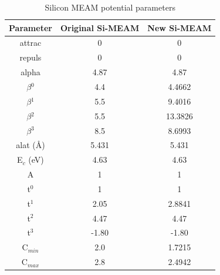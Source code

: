 \documentclass[review]{elsarticle}
\begin{document}
\begin{table}[h]
\caption{Silicon MEAM potential parameters}\label{tab:ben1}
\begin{center}
\begin{tabular}{|c|c|c|}
     \hline
     Parameter & Original Si-MEAM  & New Si-MEAM \\
     \hline
     attrac & 0 & 0 \\
     repuls & 0 & 0 \\
     alpha & 4.87 & 4.87 \\
     $\beta$$^{0}$ & 4.4 & 4.4662  \\
     $\beta$$^{1}$ & 5.5 & 9.4016 \\
     $\beta$$^{2}$ & 5.5 & 13.3826 \\  
     $\beta$$^{3}$ & 8.5 & 8.6993 \\
     alat (\AA) & 5.431 & 5.431 \\
     E$_{c}$ (eV) & 4.63 & 4.63 \\
     A & 1 & 1 \\
     t$^{0}$ & 1 & 1 \\
     t$^{1}$ & 2.05 & 2.8841 \\
     t$^{2}$ & 4.47 & 4.47 \\
     t$^{3}$ & -1.80 & -1.80 \\
     C$_{min}$ & 2.0 & 1.7215 \\ 
     C$_{max}$ & 2.8 & 2.4942 \\
     \hline
\end{tabular}
\end{center}
\label{default}
\end{table}%
\end{document}
